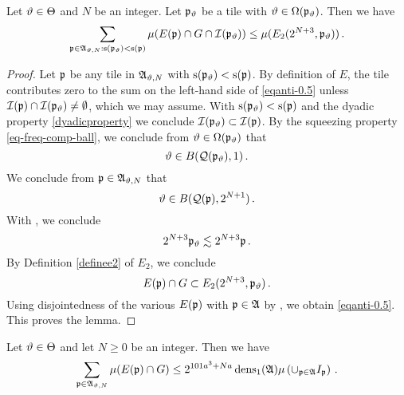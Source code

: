 \begin{lemma}\label{local-antichain-density}
\leanok
{}
Let ${\vartheta}\in{\Theta}$ and {$N$} be
an integer. Let ${\mathfrak p}_{{\vartheta}}$ be a tile with ${\vartheta}\in {\Omega}({\mathfrak p}_{{\vartheta}})$.
Then we have
\begin{equation}\label{eqanti-0.5}
    \sum_{{\mathfrak p}\in\mathfrak{A}_{{\vartheta},N}: {\mathrm{s}}({\mathfrak p}_{{\vartheta}})<{\mathrm{s}}({\mathfrak p})}\mu(E({\mathfrak p})\cap G \cap {\mathcal{I}}({\mathfrak p}_{{\vartheta}}))
    \le \mu (E_2(2^{N+3},{\mathfrak p}_{{\vartheta}}))
 \, .
\end{equation}



\end{lemma}

\begin{proof}


Let ${\mathfrak p}$ be any tile in $\mathfrak{A}_{{\vartheta},N}$ with ${\mathrm{s}}({\mathfrak p}_{{\vartheta}})<{\mathrm{s}}({\mathfrak p})$. By definition of
$E$, the tile contributes zero to the sum on the left-hand side of \eqref{eqanti-0.5} unless
 ${\mathcal{I}}({\mathfrak p})\cap {\mathcal{I}}({\mathfrak p}_{{\vartheta}}) \neq \emptyset$, which we may assume. With ${\mathrm{s}}({\mathfrak p}_{{\vartheta}})<{\mathrm{s}}({\mathfrak p})$
and the dyadic property
\eqref{dyadicproperty} we conclude ${\mathcal{I}}({\mathfrak p}_{{\vartheta}})\subset {\mathcal{I}}({\mathfrak p})$.
By the squeezing property
\eqref{eq-freq-comp-ball},
we conclude from
${\vartheta}\in {\Omega}({\mathfrak p}_{{\vartheta}})$
that
\begin{equation}
    {\vartheta}\in B({\mathcal{Q}}({\mathfrak p}_{{\vartheta}}), 1)\, .
\end{equation}
We conclude from ${\mathfrak p} \in \mathfrak{A}_{{\vartheta},N}$ that
\begin{equation}
    {\vartheta} \in B({\mathcal{Q}}({\mathfrak p}), 2^{N+1})\, .
\end{equation}
With , we conclude
\begin{equation}
    2^{N+3}{\mathfrak p}_{{\vartheta}} \lesssim 2^{N+3}{\mathfrak p} \, .
\end{equation}
By Definition \eqref{definee2} of $E_2$, we conclude
\begin{equation}
    E({\mathfrak p})\cap G \subset E_2(2^{N+3},{\mathfrak p}_{{\vartheta}})\, .
\end{equation}
Using disjointedness of the various $E({\mathfrak p})$ with ${\mathfrak p}\in \mathfrak{A}$ by , we obtain \eqref{eqanti-0.5}.
This proves the lemma.
\end{proof}
\begin{lemma}
\label{global-antichain-density}
\leanok
{}
Let ${\vartheta}\in{\Theta}$ and let $N\ge 0$ be
an integer. Then we have
\begin{equation}\label{eqanti00}
    \sum_{{\mathfrak p}\in\mathfrak{A}_{{\vartheta},N}}\mu(E({\mathfrak p})\cap G)
    \le
 2^{101a^3+Na}\operatorname{\operatorname{dens}}_1(\mathfrak{A})\mu\left(\cup_{{\mathfrak p}\in\mathfrak{A}}I_{{\mathfrak p}}\right)\, .
\end{equation}
\end{lemma}



